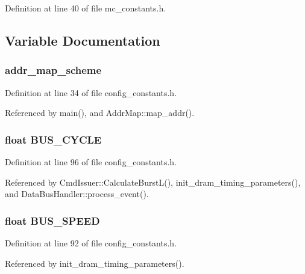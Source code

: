 Definition at line 40 of file mc\_\-constants.h.

\subsection{Variable Documentation}
\subsubsection[{addr\_\-map\_\-scheme}]{ {\bf addr\_\-map\_\-scheme}}\label{mc__constants_8h_d1a6650288eeca57ccc26007fe8b2ebe}




Definition at line 34 of file config\_\-constants.h.

Referenced by main(), and AddrMap::map\_\-addr().
\subsubsection[{BUS\_\-CYCLE}]{\setlength{\rightskip}{0pt plus 5cm}float {\bf BUS\_\-CYCLE}}\label{mc__constants_8h_6905232b437897dbbc50631f4592275e}




Definition at line 96 of file config\_\-constants.h.

Referenced by CmdIssuer::CalculateBurstL(), init\_\-dram\_\-timing\_\-parameters(), and DataBusHandler::process\_\-event().
\subsubsection[{BUS\_\-SPEED}]{\setlength{\rightskip}{0pt plus 5cm}float {\bf BUS\_\-SPEED}}\label{mc__constants_8h_97f1347e6a89939a723b3cdd452c76cb}




Definition at line 92 of file config\_\-constants.h.

Referenced by init\_\-dram\_\-timing\_\-parameters().
